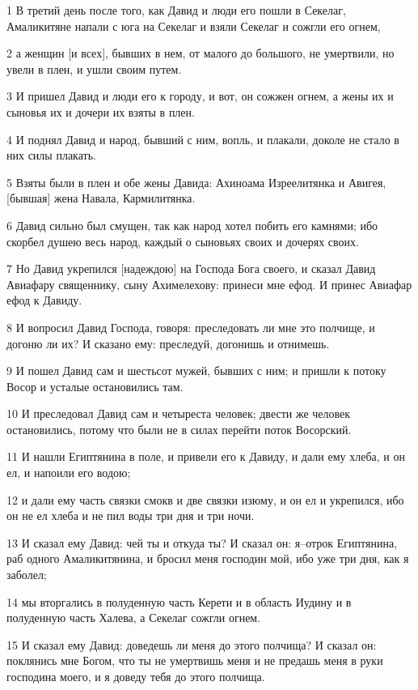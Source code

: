 \par 1 В третий день после того, как Давид и люди его пошли в Секелаг, Амаликитяне напали с юга на Секелаг и взяли Секелаг и сожгли его огнем,
\par 2 а женщин [и всех], бывших в нем, от малого до большого, не умертвили, но увели в плен, и ушли своим путем.
\par 3 И пришел Давид и люди его к городу, и вот, он сожжен огнем, а жены их и сыновья их и дочери их взяты в плен.
\par 4 И поднял Давид и народ, бывший с ним, вопль, и плакали, доколе не стало в них силы плакать.
\par 5 Взяты были в плен и обе жены Давида: Ахиноама Изреелитянка и Авигея, [бывшая] жена Навала, Кармилитянка.
\par 6 Давид сильно был смущен, так как народ хотел побить его камнями; ибо скорбел душею весь народ, каждый о сыновьях своих и дочерях своих.
\par 7 Но Давид укрепился [надеждою] на Господа Бога своего, и сказал Давид Авиафару священнику, сыну Ахимелехову: принеси мне ефод. И принес Авиафар ефод к Давиду.
\par 8 И вопросил Давид Господа, говоря: преследовать ли мне это полчище, и догоню ли их? И сказано ему: преследуй, догонишь и отнимешь.
\par 9 И пошел Давид сам и шестьсот мужей, бывших с ним; и пришли к потоку Восор и усталые остановились там.
\par 10 И преследовал Давид сам и четыреста человек; двести же человек остановились, потому что были не в силах перейти поток Восорский.
\par 11 И нашли Египтянина в поле, и привели его к Давиду, и дали ему хлеба, и он ел, и напоили его водою;
\par 12 и дали ему часть связки смокв и две связки изюму, и он ел и укрепился, ибо он не ел хлеба и не пил воды три дня и три ночи.
\par 13 И сказал ему Давид: чей ты и откуда ты? И сказал он: я--отрок Египтянина, раб одного Амаликитянина, и бросил меня господин мой, ибо уже три дня, как я заболел;
\par 14 мы вторгались в полуденную часть Керети и в область Иудину и в полуденную часть Халева, а Секелаг сожгли огнем.
\par 15 И сказал ему Давид: доведешь ли меня до этого полчища? И сказал он: поклянись мне Богом, что ты не умертвишь меня и не предашь меня в руки господина моего, и я доведу тебя до этого полчища.
